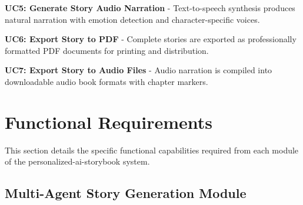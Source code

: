\textbf{UC5: Generate Story Audio Narration} - Text-to-speech synthesis produces natural narration with emotion detection and character-specific voices.

\textbf{UC6: Export Story to PDF} - Complete stories are exported as professionally formatted PDF documents for printing and distribution.

\textbf{UC7: Export Story to Audio Files} - Audio narration is compiled into downloadable audio book formats with chapter markers.

\section{Functional Requirements}

This section details the specific functional capabilities required from each module of the personalized-ai-storybook system.

\subsection{Multi-Agent Story Generation Module}

